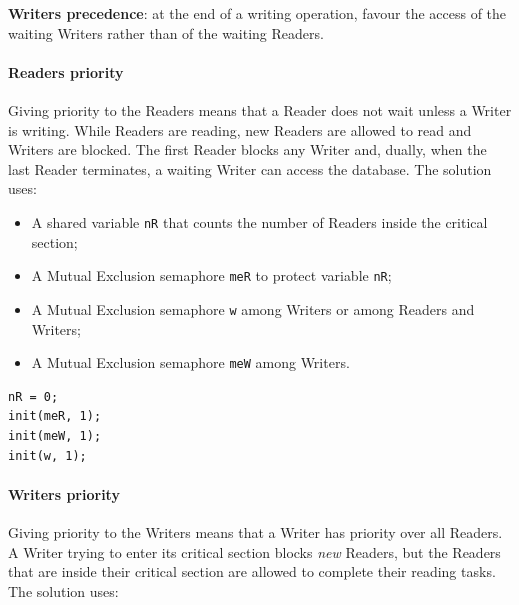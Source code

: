\textbf{Writers precedence}: at the end of a writing operation, favour the access of the waiting Writers rather than of the waiting Readers.

\paragraph{Readers priority}
Giving priority to the Readers means that a Reader does not wait unless a Writer is writing. While Readers are reading, new Readers are allowed to read and Writers are blocked. The first Reader blocks any Writer and, dually, when the last Reader terminates, a waiting Writer can access the database. The solution uses:

\begin{itemize}
\item A shared variable \texttt{nR} that counts the number of Readers inside the critical section;
\item A Mutual Exclusion semaphore \texttt{meR} to protect variable \texttt{nR};
\item A Mutual Exclusion semaphore \texttt{w} among Writers or among Readers and Writers;
\item A Mutual Exclusion semaphore \texttt{meW} among Writers.
\end{itemize}

\begin{verbatim}
nR = 0;
init(meR, 1);
init(meW, 1);
init(w, 1);
\end{verbatim}

\begin{Parallel}{}{}
\end{Parallel}

\paragraph{Writers priority}
Giving priority to the Writers means that a Writer has priority over all Readers. A Writer trying to enter its critical section blocks \textit{new} Readers, but the Readers that are inside their critical section are allowed to complete their reading tasks. The solution uses:

